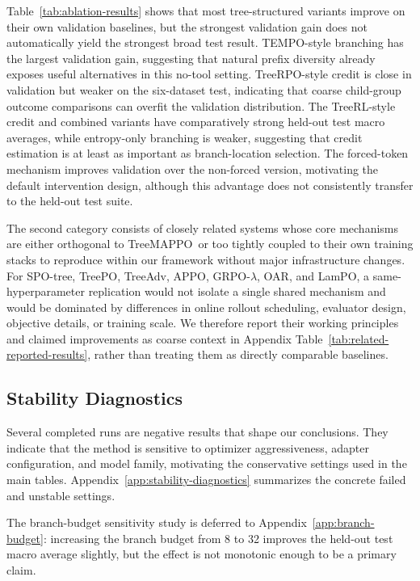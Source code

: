 \documentclass{article}
\newcommand{\ours}{TreeMAPPO\xspace}
\begin{document}
Table~\ref{tab:ablation-results} shows that most tree-structured variants improve on their own validation baselines, but the strongest validation gain does not automatically yield the strongest broad test result. TEMPO-style branching has the largest validation gain, suggesting that natural prefix diversity already exposes useful alternatives in this no-tool setting. TreeRPO-style credit is close in validation but weaker on the six-dataset test, indicating that coarse child-group outcome comparisons can overfit the validation distribution. The TreeRL-style credit and combined variants have comparatively strong held-out test macro averages, while entropy-only branching is weaker, suggesting that credit estimation is at least as important as branch-location selection. The forced-token mechanism improves validation over the non-forced version, motivating the default intervention design, although this advantage does not consistently transfer to the held-out test suite.

The second category consists of closely related systems whose core mechanisms are either orthogonal to \ours\ or too tightly coupled to their own training stacks to reproduce within our framework without major infrastructure changes. For SPO-tree, TreePO, TreeAdv, APPO, GRPO-$\lambda$, OAR, and LamPO, a same-hyperparameter replication would not isolate a single shared mechanism and would be dominated by differences in online rollout scheduling, evaluator design, objective details, or training scale. We therefore report their working principles and claimed improvements as coarse context in Appendix Table~\ref{tab:related-reported-results}, rather than treating them as directly comparable baselines.

\subsection{Stability Diagnostics}
Several completed runs are negative results that shape our conclusions. They indicate that the method is sensitive to optimizer aggressiveness, adapter configuration, and model family, motivating the conservative settings used in the main tables. Appendix~\ref{app:stability-diagnostics} summarizes the concrete failed and unstable settings.

The branch-budget sensitivity study is deferred to Appendix~\ref{app:branch-budget}: increasing the branch budget from 8 to 32 improves the held-out test macro average slightly, but the effect is not monotonic enough to be a primary claim.
\end{document}
